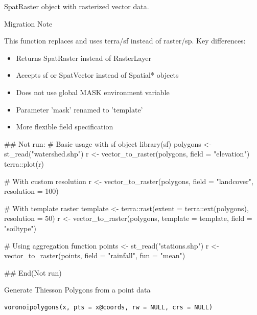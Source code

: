 \documentclass[a4paper]{book}
\begin{document}
%
\begin{Value}
SpatRaster object with rasterized vector data.
\end{Value}
%
\begin{Section}{Migration Note}

This function replaces  and uses terra/sf instead of
raster/sp. Key differences:
\begin{itemize}

\item{} Returns SpatRaster instead of RasterLayer
\item{} Accepts sf or SpatVector instead of Spatial* objects
\item{} Does not use global MASK environment variable
\item{} Parameter 'mask' renamed to 'template'
\item{} More flexible field specification

\end{itemize}

\end{Section}
%
\begin{Examples}
\begin{ExampleCode}
## Not run: 
# Basic usage with sf object
library(sf)
polygons <- st_read("watershed.shp")
r <- vector_to_raster(polygons, field = "elevation")
terra::plot(r)

# With custom resolution
r <- vector_to_raster(polygons, field = "landcover", resolution = 100)

# With template raster
template <- terra::rast(extent = terra::ext(polygons), resolution = 50)
r <- vector_to_raster(polygons, template = template, field = "soiltype")

# Using aggregation function
points <- st_read("stations.shp")
r <- vector_to_raster(points, field = "rainfall", fun = "mean")

## End(Not run)
\end{ExampleCode}
\end{Examples}
%
\begin{Description}\relax
Generate Thiesson Polygons from a point data
\end{Description}
%
\begin{Usage}
\begin{verbatim}
voronoipolygons(x, pts = x@coords, rw = NULL, crs = NULL)
\end{verbatim}
\end{Usage}
\end{document}
